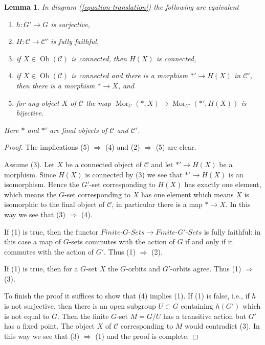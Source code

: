 \documentclass{stacks-project}
\theoremstyle{plain}
\newtheorem{lemma}[subsection]{Lemma}
\theoremstyle{definition}
\theoremstyle{remark}
\numberwithin{equation}{subsection}
\def\Mor{\mathop{\mathrm{Mor}}\nolimits}
\def\Ob{\mathop{\mathrm{Ob}}\nolimits}
\begin{document}
\begin{lemma}
\label{lemma-functoriality-galois-surjective}
In diagram (\ref{equation-translation}) the following are equivalent
\begin{enumerate}
\item $h : G' \to G$ is surjective,
\item $H : \mathcal{C} \to \mathcal{C}'$ is fully faithful,
\item if $X \in \Ob(\mathcal{C})$ is connected, then $H(X)$ is connected,
\item if $X \in \Ob(\mathcal{C})$ is connected and there is
a morphism $*' \to H(X)$ in $\mathcal{C}'$, then
there is a morphism $* \to X$, and
\item for any object $X$ of $\mathcal{C}$ the map
$\Mor_\mathcal{C}(*, X) \to \Mor_{\mathcal{C}'}(*', H(X))$
is bijective.
\end{enumerate}
Here $*$ and $*'$ are final objects of $\mathcal{C}$ and $\mathcal{C}'$.
\end{lemma}

\begin{proof}
The implications (5) $\Rightarrow$ (4) and (2) $\Rightarrow$ (5) are clear.

\medskip\noindent
Assume (3). Let $X$ be a connected object of $\mathcal{C}$ and let
$*' \to H(X)$ be a morphism. Since $H(X)$ is connected by (3)
we see that $*' \to H(X)$ is an isomorphism. Hence the $G'$-set
corresponding to $H(X)$ has exactly one element, which means the
$G$-set corresponding to $X$ has one element which means $X$ is
isomorphic to the final object of $\mathcal{C}$, in particular
there is a map $* \to X$. In this way we see that (3) $\Rightarrow$ (4).

\medskip\noindent
If (1) is true, then the functor
$\textit{Finite-}G\textit{-Sets} \to \textit{Finite-}G'\textit{-Sets}$
is fully faithful: in this case a map of $G$-sets commutes with the
action of $G$ if and only if it commutes with the action of $G'$.
Thus (1) $\Rightarrow$ (2).

\medskip\noindent
If (1) is true, then for a $G$-set $X$ the $G$-orbits and $G'$-orbits
agree. Thus (1) $\Rightarrow$ (3).

\medskip\noindent
To finish the proof it suffices to show that (4) implies (1).
If (1) is false, i.e., if $h$ is not surjective, then there is
an open subgroup $U \subset G$ containing $h(G')$ which is not
equal to $G$. Then the finite $G$-set $M = G/U$ has a transitive
action but $G'$ has a fixed point. The object $X$ of $\mathcal{C}$
corresponding to $M$ would contradict (3). In this way we see that
(3) $\Rightarrow$ (1) and the proof is complete.
\end{proof}
\end{document}
